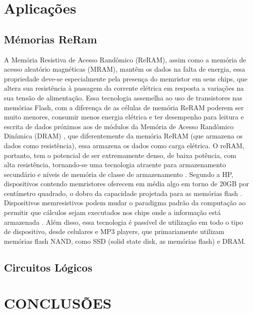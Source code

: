 \documentclass{ceel}
\begin{document}
\begin{multicols}{2}
\section{Aplicações}\label{aplicacoes}
\subsection{Mémorias ReRam}
A Memória Resistiva de Acesso Randômico (ReRAM), assim como a memória de acesso aleatório magnéticas (MRAM), mantêm os dados na falta de energia, essa propriedade deve-se especialmente pela presença do memristor em seus chips, que altera sua resistência à passagem da corrente elétrica em resposta a variações na sua tensão de alimentação.
Essa tecnologia assemelha ao uso de transistores nas memórias Flash, com a diferença de as células de memória ReRAM poderem ser muito menores, consumir menos energia elétrica e ter desempenho para leitura e escrita de dados próximos aos de módulos da Memória de Acesso Randômico Dinâmica (DRAM)\cite{blog} , que diferentemente da memória ReRAM (que armazena os dados como resistência), essa armazena os dados como carga elétrica.
O reRAM, portanto, tem o potencial de ser extremamente denso, de baixa potência, com alta resistência, tornando-se uma tecnologia atraente para armazenamento secundário e níveis de memória de classe de armazenamento \cite{prog}. Segundo a HP, dispositivos contendo memristores oferecem em média algo em torno de 20GB por centímetro quadrado, o dobro da capacidade projetada para as memórias flash \cite{hp}.
Dispositivos memresistivos podem mudar o paradigma padrão da computação ao permitir que cálculos sejam executados nos chips onde a informação está armazenada \cite{hp}. Além disso, essa tecnologia é passível de utilização em todo o tipo de dispositivo, desde celulares e MP3 players, que primariamente utilizam memórias flash NAND, como SSD (solid state disk, as memórias flash) e DRAM.

\subsection{Circuitos Lógicos}



\section{CONCLUSÕES}


\begin{thebibliography}{9}


\end{thebibliography}
\end{multicols}
\end{document}
